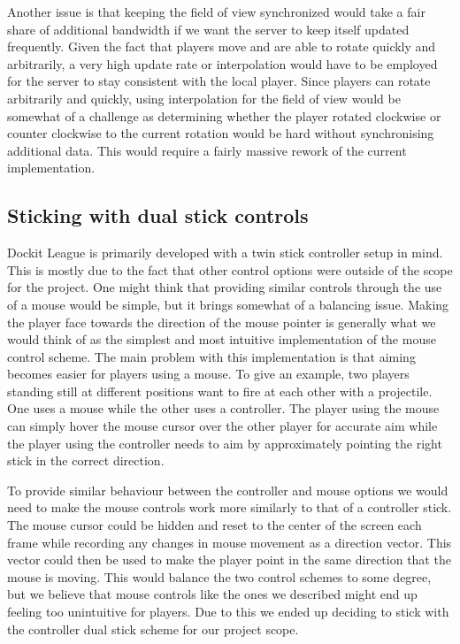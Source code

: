 Another issue is that keeping the field of view synchronized would take a fair share of additional bandwidth if we want the server to keep itself updated frequently. Given the fact that players move and are able to rotate quickly and arbitrarily, a very high update rate or interpolation would have to be employed for the server to stay consistent with the local player. Since players can rotate arbitrarily and quickly, using interpolation for the field of view would be somewhat of a challenge as determining whether the player rotated clockwise or counter clockwise to the current rotation would be hard without synchronising additional data. This would require a fairly massive rework of the current implementation.  

\subsection{Sticking with dual stick controls}
Dockit League is primarily developed with a twin stick controller setup in mind. This is mostly due to the fact that other control options were outside of the scope for the project. One might think that providing similar controls through the use of a mouse would be simple, but it brings somewhat of a balancing issue. 
Making the player face towards the direction of the mouse pointer is generally what we would think of as the simplest and most intuitive implementation of the mouse control scheme. The main problem with this implementation is that aiming becomes easier for players using a mouse. To give an example, two players standing still at different positions want to fire at each other with a projectile. One uses a mouse while the other uses a controller. The player using the mouse can simply hover the mouse cursor over the other player for accurate aim while the player using the controller needs to aim by approximately pointing the right stick in the correct direction.  

To provide similar behaviour between the controller and mouse options we would need to make the mouse controls work more similarly to that of a controller stick. The mouse cursor could be hidden and reset to the center of the screen each frame while recording any changes in mouse movement as a direction vector. This vector could then be used to make the player point in the same direction that the mouse is moving. This would balance the two control schemes to some degree, but we believe that mouse controls like the ones we described might end up feeling too unintuitive for players. Due to this we ended up deciding to stick with the controller dual stick scheme for our project scope. 
    
